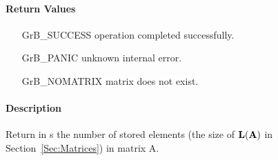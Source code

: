 \paragraph{Return Values}

\begin{itemize}[leftmargin=2.1in]
\item[{\sf GrB\_SUCCESS}]   operation completed successfully.
\item[{\sf GrB\_PANIC}]     unknown internal error.
\item[{\sf GrB\_NOMATRIX}]  matrix does not exist.
\end{itemize}

\paragraph{Description}

Return in {\sf s} the number of stored elements (the size of $\bold{L}({\bf A})$
in Section~\ref{Sec:Matrices}) in matrix {\sf A}.
